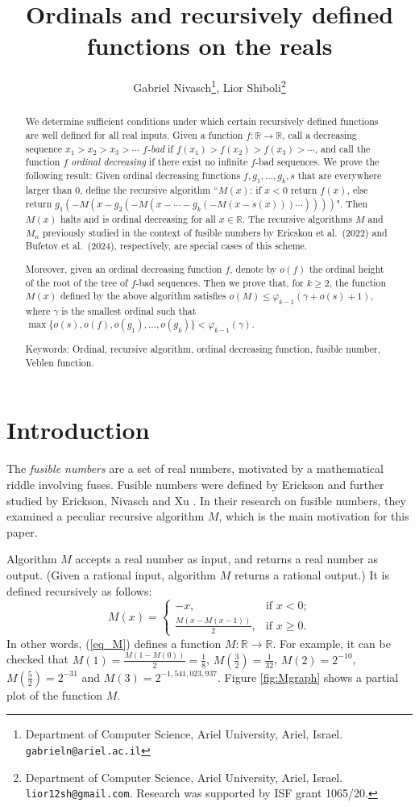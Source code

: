 \documentclass{article}
\title{Ordinals and recursively defined functions on the reals}
\author{Gabriel Nivasch\thanks{Department of Computer Science, Ariel University, Ariel, Israel. \texttt{gabrieln@ariel.ac.il}}, Lior Shiboli\thanks{Department of Computer Science, Ariel University, Ariel, Israel. \texttt{lior12sh@gmail.com}. Research was supported by ISF grant 1065/20.}}
\date{}
\theoremstyle{definition}
\begin{document}
\maketitle
\begin{abstract}
    We determine sufficient conditions under which certain recursively defined functions are well defined for all real inputs. Given a function $f:\mathbb R\to\mathbb R$, call a decreasing sequence $x_1>x_2>x_3>\cdots$ \emph{$f$-bad} if $f(x_1)>f(x_2)>f(x_3)>\cdots$, and call the function $f$ \emph{ordinal decreasing} if there exist no infinite $f$-bad sequences. We prove the following result: Given ordinal decreasing functions $f,g_1,\ldots,g_k,s$ that are everywhere larger than $0$, define the recursive algorithm ``$M(x)$: if $x<0$ return $f(x)$, else return $g_1(-M(x-g_2(-M(x-\cdots-g_k(-M(x-s(x)))\cdots))))$". Then $M(x)$ halts and is ordinal decreasing for all $x \in \mathbb{R}$. The recursive algorithms $M$ and $M_n$ previously studied in the context of fusible numbers by Ericskon et al.~(2022) and Bufetov et al.~(2024), respectively, are special cases of this scheme.

    Moreover, given an ordinal decreasing function $f$, denote by $o(f)$ the ordinal height of the root of the tree of $f$-bad sequences. Then we prove that, for $k\ge 2$, the function $M(x)$ defined by the above algorithm satisfies $o(M)\le\varphi_{k-1}(\gamma+o(s)+1)$, where $\gamma$ is the smallest ordinal such that $\max\{o(s),o(f),o(g_1), \ldots,\allowbreak o(g_k)\} <\varphi_{k-1}(\gamma)$.

    Keywords: Ordinal, recursive algorithm, ordinal decreasing function, fusible number, Veblen function.
\end{abstract}
\section{Introduction}
The \emph{fusible numbers} are a set of real numbers, motivated by a mathematical riddle involving fuses. Fusible numbers were defined by Erickson \cite{Eri} and further studied by Erickson, Nivasch and Xu \cite{ENX,Xu12}. In their research on fusible numbers, they examined a peculiar recursive algorithm $M$, which is the main motivation for this paper.

Algorithm $M$ accepts a real number as input, and returns a real number as output. (Given a rational input, algorithm $M$ returns a rational output.) It is defined recursively as follows:
\begin{equation}\label{eq_M}
        M(x) = 
            \begin{cases}
                -x ,& \text{if  $x < 0$;}\\
                \frac{M(x-M(x-1))}{2}, & \text{if  $x \geq 0$.}
            \end{cases}
\end{equation}
In other words, (\ref{eq_M}) defines a function $M:\mathbb R\to\mathbb R$.
For example, it can be checked that $M(1)=\frac{M(1-M(0))}{2}=\frac{1}{8}$, $M(\frac{3}{2})=\frac{1}{32}$, $M(2)=2^{-10}$, $M(\frac{5}{2})=2^{-31}$ and $M(3)=2^{-1,541,023,937}$. Figure \ref{fig:Mgraph} shows a partial plot of the function $M$.
\end{document}
